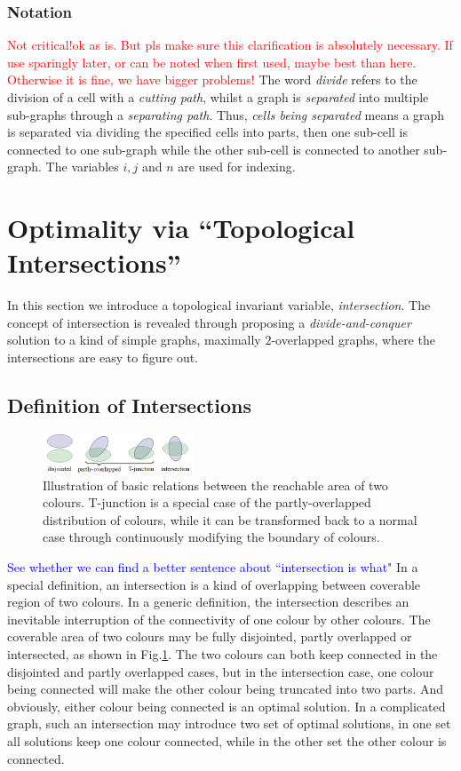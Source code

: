 \documentclass[conference]{IEEEtran}
\begin{document}
\subsubsection*{Notation}
\textcolor{red}{Not critical!ok as is. But pls make sure this clarification is absolutely necessary. If use sparingly later, or can be noted when first used, maybe best than here. Otherwise it is fine, we have bigger problems!} 
The word \textit{divide} refers to the division of a cell with a \textit{cutting path}, whilst a graph is \textit{separated} into multiple sub-graphs through a \textit{separating path}. Thus, \textit{cells being separated} means a graph is separated via dividing the specified cells into parts, then one sub-cell is connected to one sub-graph while the other sub-cell is connected to another sub-graph.  The variables $i,j$ and $n$ are used for indexing. 

\section{Optimality via ``Topological Intersections''}
\label{section_intersection}
In this section we introduce a topological invariant variable, \textit{intersection}. 
The concept of intersection is revealed through proposing a \textit{divide-and-conquer} solution to a kind of simple graphs, maximally $2$-overlapped graphs, where the intersections are easy to figure out. 
\subsection{Definition of Intersections}
\begin{figure}[t]
\centering
\includegraphics[width = 0.4\textwidth]{figures/basic_shape_2}
\caption{Illustration of basic relations between the reachable area of two colours. T-junction is a special case of the partly-overlapped distribution of colours, while it can be transformed back to a normal case through continuously modifying the boundary of colours.  }\label{fig:basic_shape}
\end{figure}
\textcolor{blue}{See whether we can find a better sentence about ``intersection is what"}
In a special definition, an intersection is a kind of overlapping between coverable region of two colours. 
In a generic definition, the intersection describes an inevitable interruption of the connectivity of one colour by other colours. 
The coverable area of two colours may be fully disjointed, partly overlapped or intersected, as shown in Fig.\ref{fig:basic_shape}. 
The two colours can both keep connected in the disjointed and partly overlapped cases, but in the intersection case, one colour being connected will make the other colour being truncated into two parts. 
And obviously, either colour being connected is an optimal solution. In a complicated graph, such an intersection may introduce two set of optimal solutions, in one set all solutions keep one colour connected, while in the other set the other colour is connected. 
\end{document}
